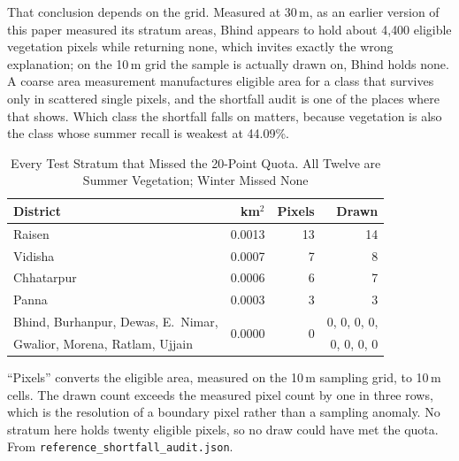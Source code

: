 \documentclass[conference]{IEEEtran}
\begin{document}
That conclusion depends on the grid. Measured at 30\,m, as an earlier version of this paper measured its stratum areas, Bhind appears to hold about 4{,}400 eligible vegetation pixels while returning none, which invites exactly the wrong explanation; on the 10\,m grid the sample is actually drawn on, Bhind holds none. A coarse area measurement manufactures eligible area for a class that survives only in scattered single pixels, and the shortfall audit is one of the places where that shows. Which class the shortfall falls on matters, because vegetation is also the class whose summer recall is weakest at 44.09\%.
\begin{table}[!htbp]
\caption{Every Test Stratum that Missed the 20-Point Quota. All Twelve are Summer Vegetation; Winter Missed None}
\label{tab_shortfall}
\begin{center}
\setlength{\tabcolsep}{4pt}
\footnotesize
\begin{tabular}{@{}lrrr@{}}
\toprule
\textbf{District} & \textbf{km$^2$} & \textbf{Pixels} & \textbf{Drawn} \\
\midrule
Raisen     & 0.0013 & 13 & 14 \\
Vidisha    & 0.0007 & 7 & 8 \\
Chhatarpur & 0.0006 & 6 & 7 \\
Panna      & 0.0003 & 3 & 3 \\
Bhind, Burhanpur, Dewas, E.\ Nimar, & \multirow{2}{*}{0.0000} & \multirow{2}{*}{0} & 0, 0, 0, 0, \\
Gwalior, Morena, Ratlam, Ujjain & & & 0, 0, 0, 0 \\
\bottomrule
\end{tabular}

\vspace{2pt}
\parbox{\columnwidth}{\footnotesize ``Pixels'' converts the eligible area, measured on the 10\,m sampling grid, to 10\,m cells. The drawn count exceeds the measured pixel count by one in three rows, which is the resolution of a boundary pixel rather than a sampling anomaly. No stratum here holds twenty eligible pixels, so no draw could have met the quota. From \texttt{reference\_shortfall\_audit.json}.}
\end{center}
\end{table}
\end{document}
